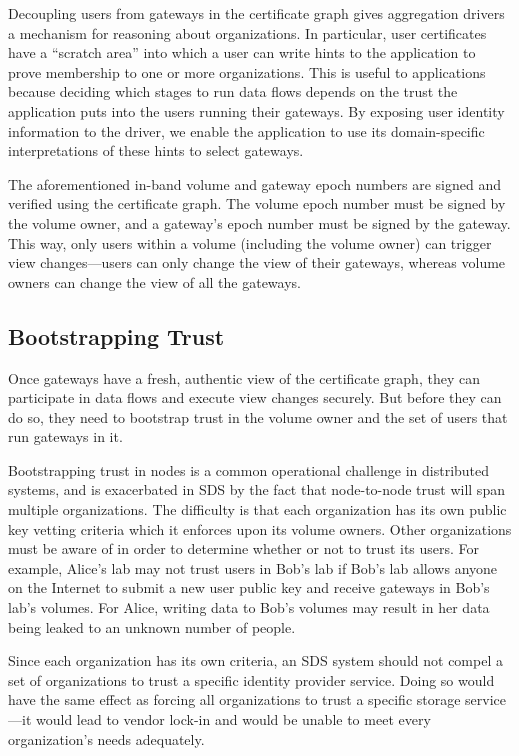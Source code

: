 Decoupling users from gateways in the certificate graph gives aggregation
drivers a mechanism for reasoning about organizations.  In particular, user
certificates have a ``scratch area'' into which a user can write hints to the
application to prove membership to one or more organizations.  This is useful
to applications because deciding which
stages to run data flows depends on the trust the application
puts into the users running their gateways.  By exposing user identity
information to the driver, we enable the application to use its domain-specific
interpretations of these hints to select gateways.

The aforementioned in-band volume and gateway epoch numbers are signed and
verified using the certificate graph.  The volume epoch number must be signed by
the volume owner, and a gateway's epoch number must be signed by the gateway.
This way, only users within a volume (including the volume owner) can trigger
view changes---users can only change the view of their gateways, whereas volume
owners can change the view of all the gateways.

\subsection{Bootstrapping Trust}
\label{sec:bootstrapping-trust}

Once gateways have a fresh, authentic view of the certificate graph, they can
participate in data flows and execute view changes securely.  But before they
can do so, they need to bootstrap trust in the volume owner and the set of users
that run gateways in it.

Bootstrapping trust in nodes is a common operational challenge in
distributed systems, and is exacerbated in SDS by the fact that node-to-node
trust will span multiple organizations.
The difficulty is that each organization has its own public
key vetting criteria which it enforces upon its volume owners.
Other organizations must be aware of in order to determine
whether or not to trust its users.  For example, Alice's lab may
not trust users in Bob's lab if Bob's lab allows anyone on the Internet
to submit a new user public key and receive gateways in Bob's
lab's volumes.  For Alice, writing data to Bob's volumes may result in her data
being leaked to an unknown number of people.

Since each organization has its own criteria,
an SDS system should not compel a set of organizations to trust a
specific identity provider service.  Doing so would have the same effect
as forcing all organizations to trust a specific storage service---it would
lead to vendor lock-in and would be unable to meet every organization's needs
adequately.

